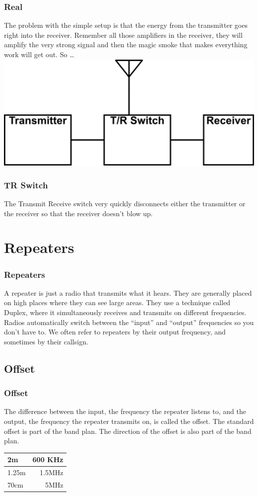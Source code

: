 \documentclass[10pt, handout]{beamer}
\begin{document}
\begin{frame}
\frametitle{Real}
The problem with the simple setup is that the energy from the transmitter goes right into the receiver. Remember all those amplifiers in the receiver, they will amplify the very strong signal and then the magic smoke that makes everything work will get out. So \ldots
\includegraphics[width=.8\textwidth]{simpletrworks.png}
\end{frame}

\begin{frame}
\frametitle{TR Switch}
The Transmit Receive switch very quickly disconnects either the transmitter or the receiver so that the receiver doesn't blow up.
\end{frame}

\section{Repeaters}

\begin{frame}
\frametitle{Repeaters}
A repeater is just a radio that transmits what it hears. They are generally placed on high places where they can see large areas. They use a technique called Duplex, where it simultaneously receives and transmits on different frequencies. Radios automatically switch between the ``input'' and ``output'' frequencies so you don't have to. We often refer to repeaters by their output frequency, and sometimes by their callsign.
\end{frame}

\subsection{Offset}

\begin{frame}
\frametitle{Offset}
The difference between the input, the frequency the repeater listens to, and the output, the frequency the repeater transmits on, is called the offset. The standard offset is part of the band plan. The direction of the offset is also part of the band plan.\\
\begin{tabular}{|l|r|}
\hline
2m & 600 KHz\\ \hline
1.25m & 1.5MHz \\ \hline
70cm & 5MHz \\
\hline
\end{tabular}
\end{frame}
\end{document}
